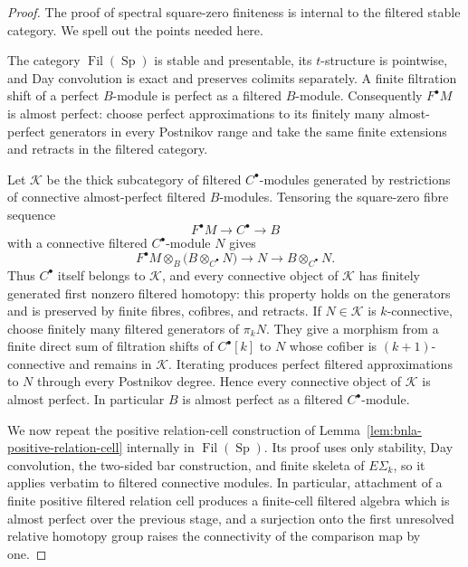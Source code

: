 \begin{proof}
The proof of spectral square-zero finiteness is internal to the filtered
stable category.  We spell out the points needed here.

The category $\operatorname{Fil}(\operatorname{Sp})$ is stable and
presentable, its $t$-structure is pointwise, and Day convolution is exact and
preserves colimits separately.  A finite filtration shift of a perfect
$B$-module is perfect as a filtered $B$-module.  Consequently $F^\bullet M$
is almost perfect: choose perfect approximations to its finitely many
almost-perfect generators in every Postnikov range and take the same finite
extensions and retracts in the filtered category.

Let $\mathcal K$ be the thick subcategory of filtered
$C^\bullet$-modules generated by restrictions of connective almost-perfect
filtered $B$-modules.  Tensoring the square-zero fibre sequence
\[
    F^\bullet M\longrightarrow C^\bullet\longrightarrow B
\]
with a connective filtered $C^\bullet$-module $N$ gives
\[
    F^\bullet M\otimes_B
    \bigl(B\otimes_{C^\bullet}N\bigr)
    \longrightarrow
    N
    \longrightarrow
    B\otimes_{C^\bullet}N.
\]
Thus $C^\bullet$ itself belongs to $\mathcal K$, and every connective object
of $\mathcal K$ has finitely generated first nonzero filtered homotopy: this
property holds on the generators and is preserved by finite fibres, cofibres,
and retracts.  If $N\in\mathcal K$ is $k$-connective, choose finitely many
filtered generators of $\pi_kN$.  They give a morphism from a finite direct
sum of filtration shifts of $C^\bullet[k]$ to $N$ whose cofiber is
$(k+1)$-connective and remains in $\mathcal K$.  Iterating produces perfect
filtered approximations to $N$ through every Postnikov degree.  Hence every
connective object of $\mathcal K$ is almost perfect.  In particular $B$ is
almost perfect as a filtered $C^\bullet$-module.

We now repeat the positive relation-cell construction of
Lemma~\ref{lem:bnla-positive-relation-cell} internally in
$\operatorname{Fil}(\operatorname{Sp})$.  Its proof uses only stability, Day
convolution, the two-sided bar construction, and finite skeleta of
$E\Sigma_k$, so it applies verbatim to filtered connective modules.  In
particular, attachment of a finite positive filtered relation cell produces a
finite-cell filtered algebra which is almost perfect over the previous stage,
and a surjection onto the first unresolved relative homotopy group raises the
connectivity of the comparison map by one.


\end{proof}
